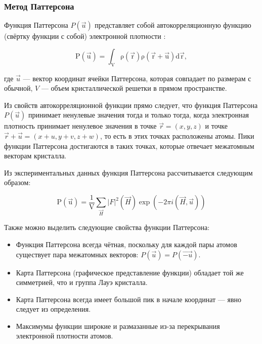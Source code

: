 \subsubsection{Метод Паттерсона}

Функция Паттерсона $P(\overrightarrow{u})$ представляет собой автокорреляционную функцию (свёртку функции с собой) электронной плотности \cite{girolami_x-ray_2016}:

\begin{equation}
	\mathrm{P(\overrightarrow{u}) = \int_V \rho(\overrightarrow{r})\rho(\overrightarrow{r}+\overrightarrow{u})d\overrightarrow{r}},
\end{equation}

где $\overrightarrow{u}$ --- вектор координат ячейки Паттерсона, которая совпадает по размерам с обычной, $V$ --- объем кристаллической решетки в прямом пространстве.

Из свойств автокорреляционной функции прямо следует, что функция Паттерсона $P(\overrightarrow{u})$ принимает ненулевые значения тогда и только тогда, когда электронная плотность принимает ненулевое значения в точке $\overrightarrow{r} = (x,y,z)$ и точке $\overrightarrow{r}+\overrightarrow{u} = (x+u, y+v, z+w)$, то есть в этих точках расположены атомы. Пики функции Паттерсона достигаются в таких точках, которые отвечает межатомным векторам кристалла.

Из экспериментальных данных функция Паттерсона рассчитывается следующим образом:

\begin{equation}\label{patt_start}
	\mathrm{P(\overrightarrow{u})=\frac{1}{V}}\sum_{\overrightarrow{H}}|F|^2(\overrightarrow{H})\exp(-2\pi i (\overrightarrow{H}, \overrightarrow{u}))
\end{equation}


Также можно выделить следующие свойства функции Паттерсона:

\begin{itemize}
	\item Функция Паттерсона всегда чётная, поскольку для каждой пары атомов существует пара межатомных векторов: $P(\overrightarrow{u}) = P(\overrightarrow{-u})$.
	\item Карта Паттерсона (графическое представление функции) обладает той же симметрией, что и группа Лауэ кристалла.
	\item Карта Паттерсона всегда имеет большой пик в начале координат --- явно следует из определения.
	\item Максимумы функции широкие и размазанные из-за перекрывания электронной плотности атомов.
\end{itemize}


